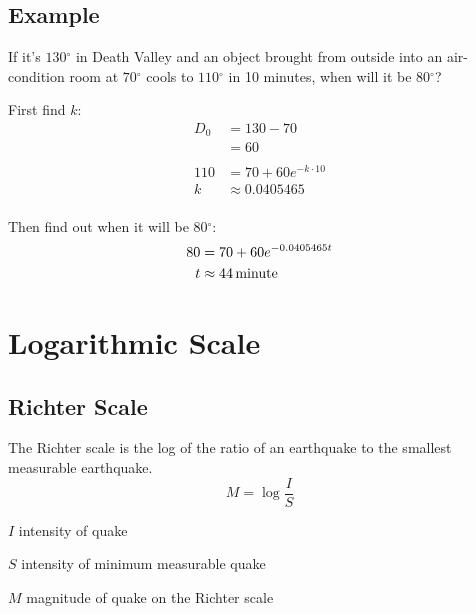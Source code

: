 \documentclass{exam}
\newcommand{\degree}{\ensuremath{^\circ}}
\begin{document}
  \subsection{Example}
    If it's $130 \degree$ in Death Valley and an object brought from outside into an air-condition room at $70
    \degree$ cools to $110 \degree$ in 10 minutes, when will it be $80 \degree$?

    First find $k$:
    \begin{align*}
      D_0 & = 130 - 70 \\
          & = 60 \\
      \\
      110 & = 70 + 60 e^{-k \cdot 10} \\
      k   & \approx 0.0405465 \\
    \end{align*}

    Then find out when it will be $80 \degree$:
    \begin{align*}
      80 & = 70 + 60 e^{-0.0405465 t} \\
      t  & \approx \unit[44]{minute} \\
    \end{align*}

  \section{Logarithmic Scale}

  \subsection{Richter Scale}
  The Richter scale is the log of the ratio of an earthquake to the smallest measurable earthquake.
  \[
    M = \log \frac{I}{S}
  \]

  \begin{itemize*}
    \item $I$ intensity of quake 
    \item $S$ intensity of minimum measurable quake
    \item $M$ magnitude of quake on the Richter scale
  \end{itemize*}
\end{document}
